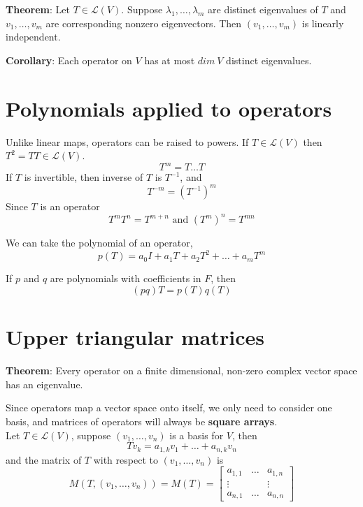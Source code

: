 \documentclass[a4paper, 10pt]{report}
\begin{document}
\begin{framed}
   \textbf{Theorem}: Let $T \in \mathcal{L}(V) $. Suppose  $\lambda_1, \hdots, \lambda_m$ are distinct eigenvalues of $T$ and $v_1, \hdots, v_m$ are corresponding nonzero eigenvectors. Then $(v_1, \hdots, v_m)$ is linearly independent. 

   \textbf{Corollary}: Each operator on $V$ has at most $dim\ V$ distinct eigenvalues. 
\end{framed}

\section{Polynomials applied to operators}

Unlike linear maps, operators can be raised to powers. If $T \in \mathcal{L}(V)$ then  $T^2 = TT \in \mathcal{L}(V)$.  \\

\[
  T^m = T \hdots T
\] 
If $T$ is invertible, then inverse of $T$ is $T^{-1}$, and
\[
   T^{-m} = \left(T^{-1}\right)^m
\]
Since $T$ is an operator
\[
   T^m T^n = T^{m + n} \text{ and } (T^m)^n = T^{mn}
\] 

We can take the polynomial of an operator, 
\[
  p(T) = a_0 I + a_1 T + a_2 T^2 + \hdots + a_m T^m
\] 

If $p$ and  $q$ are polynomials with coefficients in $F$, then 
\[
   (pq)T = p(T) q(T)
\] 

\section{Upper triangular matrices}
\begin{framed}
\textbf{Theorem}: Every operator on a finite dimensional, non-zero complex vector space has an eigenvalue. 
\end{framed}

Since operators map a vector space onto itself, we only need to consider one basis, and matrices of operators will always be \textbf{square arrays}. \\

Let $T \in \mathcal{L}(V)$, suppose  $(v_1, \hdots, v_n)$ is a basis for $V$, then 
\[
   Tv_k = a_{1, k}v_1  + \hdots + a_{n, k} v_n
\] 
and the matrix of $T$ with respect to  $(v_1, \hdots, v_n)$ is 
\[
  M(T, (v_1, \hdots, v_n)) = M(T) = \begin{bmatrix} 
     a_{1, 1}   & \hdots & a_{1, n} \\
     \vdots& & \vdots \\
     a_{n, 1}   & \hdots & a_{n, n}
  \end{bmatrix}
\] 
 
\end{document}
